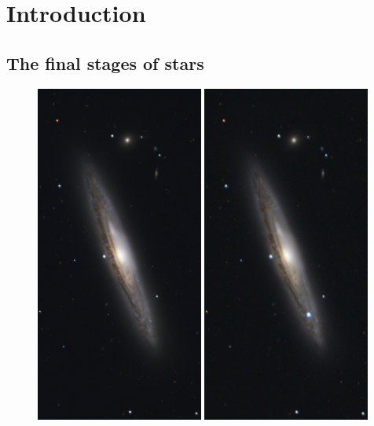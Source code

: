 \documentclass[a4paper,oneside,12pt, class=Latex/Classes/PhDthesisPSnPDF, crop=false]{standalone}
\begin{document}
\doublespacing
\chapter{Introduction}
\label{chap:intro}

\section{The final stages of stars}

\begin{figure}
    \centering
    \includegraphics[width=0.49\textwidth]{../Images/chapter_1/SN2024gy_pre-SN.png}
    \includegraphics[width=0.49\textwidth]{../Images/chapter_1/SN2024gy_active.png}

\end{figure}
\end{document}
